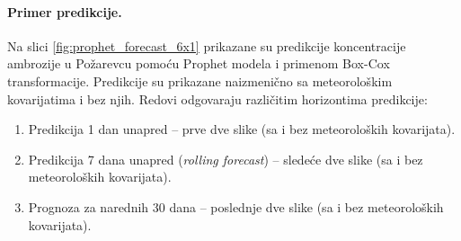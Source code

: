\documentclass[12pt]{article}
\begin{document}
\begin{table}[h!]
\centering
\caption{Prophet – početak sezone polena: stvarni datum i predikcija 7 dana unapred.}
\label{tab:prophet_start_season}
\end{table}
\newpage
\paragraph{\textbf{Primer predikcije.}}  
Na slici \ref{fig:prophet_forecast_6x1} prikazane su predikcije koncentracije ambrozije u Požarevcu pomoću Prophet modela i primenom Box-Cox transformacije.  
Predikcije su prikazane naizmenično sa meteorološkim kovarijatima i bez njih.  
Redovi odgovaraju različitim horizontima predikcije:  
\begin{enumerate}
    \item Predikcija 1 dan unapred – prve dve slike (sa i bez meteoroloških kovarijata).
    \item Predikcija 7 dana unapred (\textit{rolling forecast}) – sledeće dve slike (sa i bez meteoroloških kovarijata).
    \item Prognoza za narednih 30 dana – poslednje dve slike (sa i bez meteoroloških kovarijata).
\end{enumerate}
\end{document}
